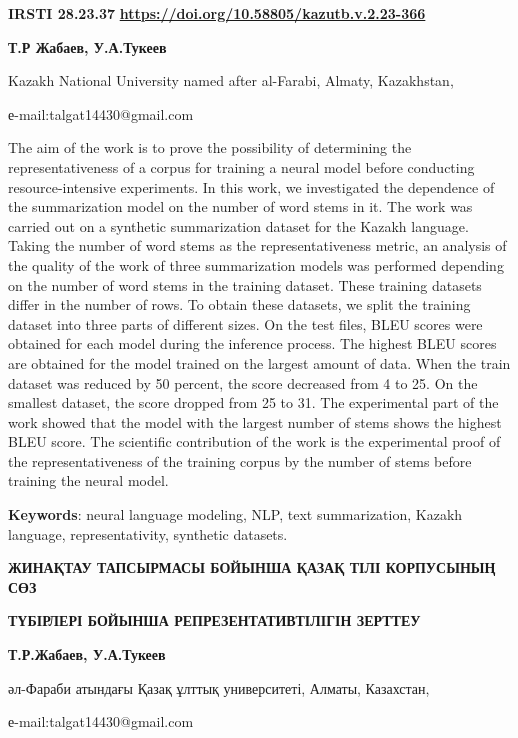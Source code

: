 \newpage
{}
{\bfseries IRSTI 28.23.37}
\hfill {\bfseries \href{https://doi.org/10.58805/kazutb.v.2.23-366}{https://doi.org/10.58805/kazutb.v.2.23-366}}


\begin{center}
{\bfseries Т.Р Жабаев\envelope, У.А.Тукеев}

Kazakh National University named after al-Farabi, Almaty, Kazakhstan,

е-mail:talgat14430@gmail.com
\end{center}

The aim of the work is to prove the possibility of determining the
representativeness of a corpus for training a neural model before
conducting resource-intensive experiments. In this work, we investigated
the dependence of the summarization model on the number of word stems in
it. The work was carried out on a synthetic summarization dataset for
the Kazakh language. Taking the number of word stems as the
representativeness metric, an analysis of the quality of the work of
three summarization models was performed depending on the number of word
stems in the training dataset. These training datasets differ in the
number of rows. To obtain these datasets, we split the training dataset
into three parts of different sizes. On the test files, BLEU scores were
obtained for each model during the inference process. The highest BLEU
scores are obtained for the model trained on the largest amount of data.
When the train dataset was reduced by 50 percent, the score decreased
from 4 to 25. On the smallest dataset, the score dropped from 25 to 31.
The experimental part of the work showed that the model with the largest
number of stems shows the highest BLEU score. The scientific
contribution of the work is the experimental proof of the
representativeness of the training corpus by the number of stems before
training the neural model.

{\bfseries Keywords}: neural language modeling, NLP, text summarization,
Kazakh language, representativity, synthetic datasets.

\begin{center}
{\large\bfseries ЖИНАҚТАУ ТАПСЫРМАСЫ БОЙЫНША ҚАЗАҚ ТІЛІ КОРПУСЫНЫҢ СӨЗ}

{\bfseries ТҮБІРЛЕРІ БОЙЫНША РЕПРЕЗЕНТАТИВТІЛІГІН ЗЕРТТЕУ}

{\bfseries Т.Р.Жабаев\envelope, У.А.Тукеев}

әл-Фараби атындағы Қазақ ұлттық университеті, Алматы, Казахстан,

е-mail:talgat14430@gmail.com
\end{center}

